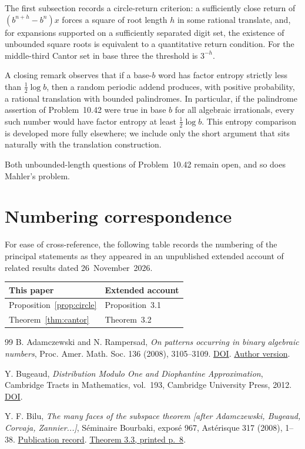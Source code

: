 \documentclass[11pt,reqno,a4paper]{amsart}
\theoremstyle{remark}
\begin{document}
The first subsection records a circle-return criterion: a sufficiently close return of $(b^{n+h}-b^n)x$ forces a square of root length $h$ in some rational translate, and, for expansions supported on a sufficiently separated digit set, the existence of unbounded square roots is equivalent to a quantitative return condition. For the middle-third Cantor set in base three the threshold is $3^{-h}$.

A closing remark observes that if a base-$b$ word has factor entropy strictly less than $\tfrac12\log b$, then a random periodic addend produces, with positive probability, a rational translation with bounded palindromes. In particular, if the palindrome assertion of Problem~10.42 were true in base $b$ for all algebraic irrationals, every such number would have factor entropy at least $\tfrac12\log b$. This entropy comparison is developed more fully elsewhere; we include only the short argument that sits naturally with the translation construction.

Both unbounded-length questions of Problem~10.42 remain open, and so does Mahler's problem.



\section*{Numbering correspondence}
For ease of cross-reference, the following table records the numbering of the principal statements as they appeared in an unpublished extended account of related results dated 26~November~2026.
\begin{center}
\begin{tabular}{@{}ll@{}}
\toprule
This paper & Extended account \\
\midrule
Proposition~\ref{prop:circle} & Proposition~3.1 \\
Theorem~\ref{thm:cantor} & Theorem~3.2 \\
\bottomrule
\end{tabular}
\end{center}

\begin{thebibliography}{99}
B. Adamczewski and N. Rampersad,
\emph{On patterns occurring in binary algebraic numbers},
Proc. Amer. Math. Soc. 136 (2008), 3105--3109.
\href{https://doi.org/10.1090/S0002-9939-08-09319-2}{DOI}.
\href{https://adamczewski.perso.math.cnrs.fr/Overlap.pdf}{Author version}.

Y. Bugeaud,
\emph{Distribution Modulo One and Diophantine Approximation},
Cambridge Tracts in Mathematics, vol.~193, Cambridge University Press,
2012.
\href{https://doi.org/10.1017/CBO9781139017732}{DOI}.

Y. F. Bilu, \emph{The many faces of the subspace theorem [after
Adamczewski, Bugeaud, Corvaja, Zannier...]}, S\'eminaire Bourbaki,
expos\'e 967, Ast\'erisque 317 (2008), 1--38.
\href{https://www.numdam.org/book-part/AST_2008__317__1_0/}{Publication record}.
\href{https://arxiv.org/pdf/0907.2098#page=8}{Theorem 3.3, printed p.~8}.


\end{thebibliography}
\end{document}
